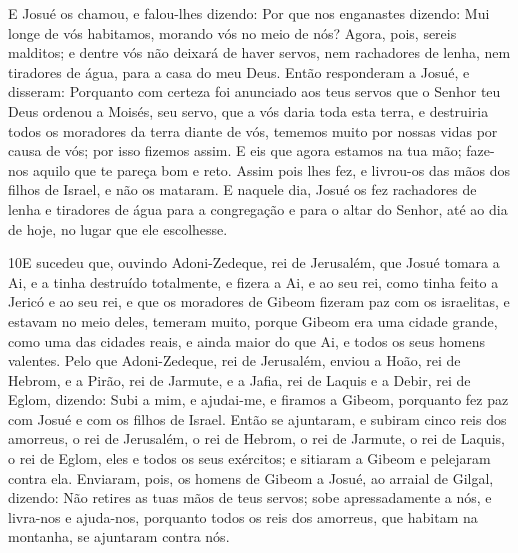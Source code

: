 E Josué os chamou, e falou-lhes dizendo: Por que nos enganastes
dizendo: Mui longe de vós habitamos, morando vós no meio de nós?
Agora, pois, sereis malditos; e dentre vós não deixará de
haver servos, nem rachadores de lenha, nem tiradores de água, para a
casa do meu Deus. Então responderam a Josué, e disseram:
Porquanto com certeza foi anunciado aos teus servos que o Senhor teu
Deus ordenou a Moisés, seu servo, que a vós daria toda esta terra, e
destruiria todos os moradores da terra diante de vós, tememos muito
por nossas vidas por causa de vós; por isso fizemos assim. E
eis que agora estamos na tua mão; faze-nos aquilo que te pareça bom
e reto. Assim pois lhes fez, e livrou-os das mãos dos filhos
de Israel, e não os mataram. E naquele dia, Josué os fez
rachadores de lenha e tiradores de água para a congregação e para o
altar do Senhor, até ao dia de hoje, no lugar que ele escolhesse.

\medskip

\lettrine{10} E sucedeu que, ouvindo Adoni-Zedeque, rei de
Jerusalém, que Josué tomara a Ai, e a tinha destruído totalmente, e
fizera a Ai, e ao seu rei, como tinha feito a Jericó e ao seu rei, e
que os moradores de Gibeom fizeram paz com os israelitas, e estavam
no meio deles, temeram muito, porque Gibeom era uma cidade
grande, como uma das cidades reais, e ainda maior do que Ai, e todos
os seus homens valentes. Pelo que Adoni-Zedeque, rei de
Jerusalém, enviou a Hoão, rei de Hebrom, e a Pirão, rei de Jarmute,
e a Jafia, rei de Laquis e a Debir, rei de Eglom, dizendo: Subi
a mim, e ajudai-me, e firamos a Gibeom, porquanto fez paz com Josué
e com os filhos de Israel. Então se ajuntaram, e subiram cinco
reis dos amorreus, o rei de Jerusalém, o rei de Hebrom, o rei de
Jarmute, o rei de Laquis, o rei de Eglom, eles e todos os seus
exércitos; e sitiaram a Gibeom e pelejaram contra ela. Enviaram,
pois, os homens de Gibeom a Josué, ao arraial de Gilgal, dizendo:
Não retires as tuas mãos de teus servos; sobe apressadamente a nós,
e livra-nos e ajuda-nos, porquanto todos os reis dos amorreus, que
habitam na montanha, se ajuntaram contra nós.

